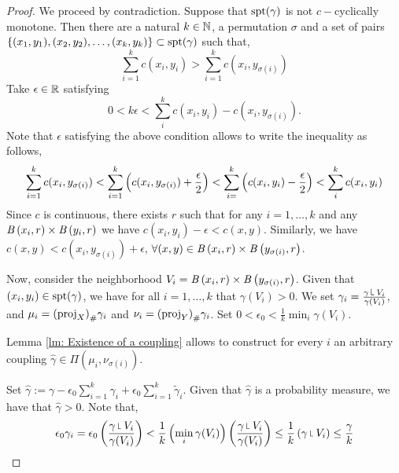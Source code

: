 \begin{proof}
	We proceed by contradiction. Suppose that $\spt(\gamma)$ is not $c-$cyclically monotone. Then there are a natural $k\in\Naturals$, a permutation $\sigma$ and a set of pairs $\braces{(x_1, y_1), (x_2,y_2), \dots, (x_k, y_k)}\subset \spt(\gamma)$ such that,
	\begin{equation*}
		\sum_{i=1}^{k}c(x_i, y_i) > \sum_{i=1}^{k} c(x_i, y_{\sigma(i)})
	\end{equation*}
Take $\epsilon\in \Real$ satisfying
\begin{equation*}
0<k\epsilon<\sum_{i}^{k}c(x_i, y_i)-c(x_i, y_{\sigma(i)}).
\end{equation*} 
Note that $\epsilon$ satisfying the above condition allows to write the inequality as follows,
\begin{equation*}
	\sum_{i=1}^{k}c(x_i,y_{\sigma(i)})<\sum_{i=1}^{k}\parentheses{c(x_i, y_{\sigma(i)})+\frac{\epsilon}{2}}<\sum_{i=}^{k}\parentheses{c(x_i, y_i)-\frac{\epsilon}{2}}<\sum_{i}^{k}c(x_i, y_i)
\end{equation*}
Since $c$ is continuous, there exists $r$ such that for any $i=1,\dots,k$ and any $\ball{x_i}{r}\times \ball{y_i}{r}$ we have $c(x_i, y_i)-\epsilon<c(x, y)$. Similarly, we have $c(x,y)<c(x_i, y_{\sigma(i)})+\epsilon$, $\forall (x,y)\in\ball{x_i}{r}\times\ball{y_{\sigma(i)}}{r}$. 

Now, consider the neighborhood $V_i=\ball{x_i}{r}\times\ball{y_{\sigma(i)}}{r}$. Given that $(x_i, y_i)\in \spt(\gamma)$, we have for all $i=1,\dots,k$ that $\gamma(V_i)>0$. We set $\gamma_i=\frac{\gamma\measurerestr V_i}{\gamma(V_i)}$, and $\mu_i=\Tmeasure{\gamma_i}{(\proj_X)}$ and $\nu_i=\Tmeasure{\gamma_i}{(\proj_Y)}$. Set $0<\epsilon_0<\frac{1}{k}\min_{i}\gamma(V_i)$.

Lemma \ref{lm: Existence of a coupling} allows to construct for every $i$ an arbitrary coupling $\hat{\gamma}\in \Pi(\mu_i, \nu_{\sigma(i)})$.  

Set $\hat\gamma:=\gamma-\epsilon_0\sum_{i=1}^{k}\gamma_i+\epsilon_0\sum_{i=1}^{k}\tilde\gamma_i$. Given that $\hat{\gamma}$ is a probability measure, we have that $\hat\gamma>0$. Note that, 
\begin{equation*}
	\epsilon_0\gamma_i=\epsilon_0\parentheses{\frac{\gamma\measurerestr V_i}{\gamma(V_i)}}<\frac{1}{k}\parentheses{\min_i \gamma(V_i)}\parentheses{\frac{\gamma\measurerestr V_i}{\gamma(V_i)}}\leq\frac{1}{k}\parentheses{\gamma\measurerestr V_i} \leq \frac{\gamma}{k}
\end{equation*} 


\end{proof}
